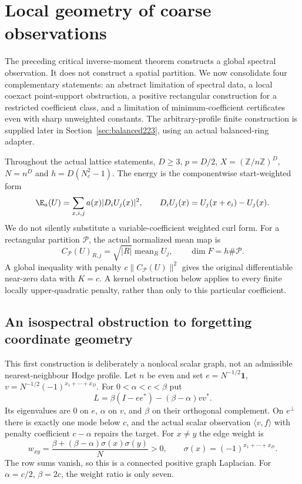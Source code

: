 \clearpage
\section{Local geometry of coarse observations}\label{sec:geometry183}
The preceding critical inverse-moment theorem constructs a global spectral
observation. It does not construct a spatial partition. We now consolidate
four complementary statements: an abstract limitation of spectral data,
a local coexact point-support obstruction, a positive rectangular construction
for a restricted coefficient class, and a limitation of minimum-coefficient
certificates even with sharp unweighted constants. The arbitrary-profile finite construction is supplied later in
Section~\ref{sec:balanced223}, using an actual balanced-ring adapter.

Throughout the actual lattice statements, $D\geq3$, $p=D/2$,
$X=(\mathbb Z/n\mathbb Z)^D$, $N=n^D$ and $h=D(N_c^2-1)$.
The energy is the componentwise start-weighted form
\[
 \E_a(U)=\sum_{x,i,j}a(x)|D_iU_j(x)|^2,\qquad
 D_iU_j(x)=U_j(x+e_i)-U_j(x).
\]
We do not silently substitute a variable-coefficient weighted curl form.
For a rectangular partition $\mathcal P$, the actual normalized mean map is
\[
 C_{\mathcal P}(U)_{R,j}=\sqrt{|R|}\operatorname{mean}_R U_j,
 \qquad \dim F=h\#\mathcal P.
\]
A global inequality with penalty $c\|C_{\mathcal P}(U)\|^2$ gives the
original differentiable near-zero data with $K=c$. A kernel obstruction
below applies to every finite locally upper-quadratic penalty, rather
than only to this particular coefficient.

\subsection{An isospectral obstruction to forgetting coordinate geometry}
This first construction is deliberately a nonlocal scalar graph, not an
admissible nearest-neighbour Hodge profile. Let $n$ be even and set
$e=N^{-1/2}\mathbf1$, $v=N^{-1/2}(-1)^{x_1+\cdots+x_D}$. For $0<\alpha<c<\beta$ put
\[
 L=\beta(I-ee^*)-(\beta-\alpha)vv^*.
\]
Its eigenvalues are $0$ on $e$, $\alpha$ on $v$, and $\beta$ on their
orthogonal complement. On $e^\perp$ there is exactly one mode below $c$,
and the actual scalar observation $\langle v,f\rangle$ with penalty
coefficient $c-\alpha$ repairs the target. For $x\ne y$ the edge weight is
\[
 w_{xy}=\frac{\beta+(\beta-\alpha)\sigma(x)\sigma(y)}N>0,
 \qquad \sigma(x)=(-1)^{x_1+\cdots+x_D}.
\]
The row sums vanish, so this is a connected positive graph Laplacian.
For $\alpha=c/2$, $\beta=2c$, the weight ratio is only seven.

